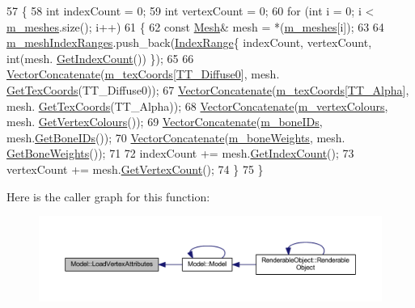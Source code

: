 \begin{DoxyCode}
57 \{
58   \textcolor{keywordtype}{int} indexCount = 0;
59   \textcolor{keywordtype}{int} vertexCount = 0;
60   \textcolor{keywordflow}{for} (\textcolor{keywordtype}{int} i = 0; i < \hyperlink{class_model_a2f3d6af54716219364db7bc87e231e3b}{m\_meshes}.size(); i++)
61   \{
62     \textcolor{keyword}{const} \hyperlink{class_mesh}{Mesh}& mesh = *(\hyperlink{class_model_a2f3d6af54716219364db7bc87e231e3b}{m\_meshes}[i]);
63 
64     \hyperlink{class_model_a1f36d8e62aa0375e25255f6e0f8bc5c5}{m\_meshIndexRanges}.push\_back(\hyperlink{struct_index_range}{IndexRange}\{ indexCount, vertexCount, int(mesh.
      \hyperlink{class_i_mesh_af017d9682b2b9d9caef0a81f616be47d}{GetIndexCount}()) \});
65 
66     \hyperlink{_utility_8h_a1ba347936108dbbe6b156bdd171634f2}{VectorConcatenate}(\hyperlink{class_model_acfac7d57325506a10c5ce88a01d97084}{m\_texCoords}[\hyperlink{_material_8h_a65468556d79304b3a4bfc464cc12e549a930f237c6d8e17be231333de7101cd87}{TT\_Diffuse0}], mesh.
      \hyperlink{class_mesh_a439e94789ab0ea3ed621571d51e3a8b5}{GetTexCoords}(TT\_Diffuse0));
67     \hyperlink{_utility_8h_a1ba347936108dbbe6b156bdd171634f2}{VectorConcatenate}(\hyperlink{class_model_acfac7d57325506a10c5ce88a01d97084}{m\_texCoords}[\hyperlink{_material_8h_a65468556d79304b3a4bfc464cc12e549a910fc22c8e04281e120beb6222bdfcd3}{TT\_Alpha}], mesh.
      \hyperlink{class_mesh_a439e94789ab0ea3ed621571d51e3a8b5}{GetTexCoords}(TT\_Alpha));
68     \hyperlink{_utility_8h_a1ba347936108dbbe6b156bdd171634f2}{VectorConcatenate}(\hyperlink{class_model_a91c387e31388fe3c51bbbb69128d5783}{m\_vertexColours}, mesh.
      \hyperlink{class_mesh_a34a5a4c2176fb4b6d28376dda371f2ee}{GetVertexColours}());
69     \hyperlink{_utility_8h_a1ba347936108dbbe6b156bdd171634f2}{VectorConcatenate}(\hyperlink{class_model_a72f6e571825db39cd4b2308b7bdc9579}{m\_boneIDs}, mesh.\hyperlink{class_mesh_ac0e35c1a8db55cd42eecec5c1f4759ce}{GetBoneIDs}());
70     \hyperlink{_utility_8h_a1ba347936108dbbe6b156bdd171634f2}{VectorConcatenate}(\hyperlink{class_model_a8b566d004af5119df6c58068c2bfaf35}{m\_boneWeights}, mesh.
      \hyperlink{class_mesh_a62cb72d0b97f28cb095e1e9425217c83}{GetBoneWeights}());
71 
72     indexCount += mesh.\hyperlink{class_i_mesh_af017d9682b2b9d9caef0a81f616be47d}{GetIndexCount}();
73     vertexCount += mesh.\hyperlink{class_i_mesh_aff814631d73a51d364824632beabe147}{GetVertexCount}();
74   \}
75 \}
\end{DoxyCode}


Here is the caller graph for this function\+:\nopagebreak
\begin{figure}[H]
\begin{center}
\leavevmode
\includegraphics[width=350pt]{class_model_a16116c10d24e886acf1dcb44718695ea_icgraph}
\end{center}
\end{figure}




